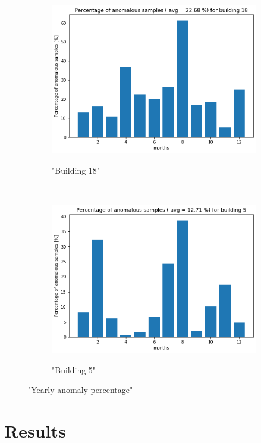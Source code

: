 \begin{figure}[H]
    \begin{subfigure}{.5\textwidth}
		\caption{"Building 18"}
		\includegraphics[width=1\linewidth]{../Figures/EC/b18year.png}
		\label{fig:ec_b18year}
	\end{subfigure}%
    ~ 
    \begin{subfigure}{.5\textwidth}
		\caption{"Building 5"}
		\includegraphics[width=1\linewidth]{../Figures/EC/b5year.png}
		\label{fig:ec_b5year}
	\end{subfigure}%
	\label{fig:ec_year}
	\caption{"Yearly anomaly percentage"}
\end{figure}


\section{Results}

